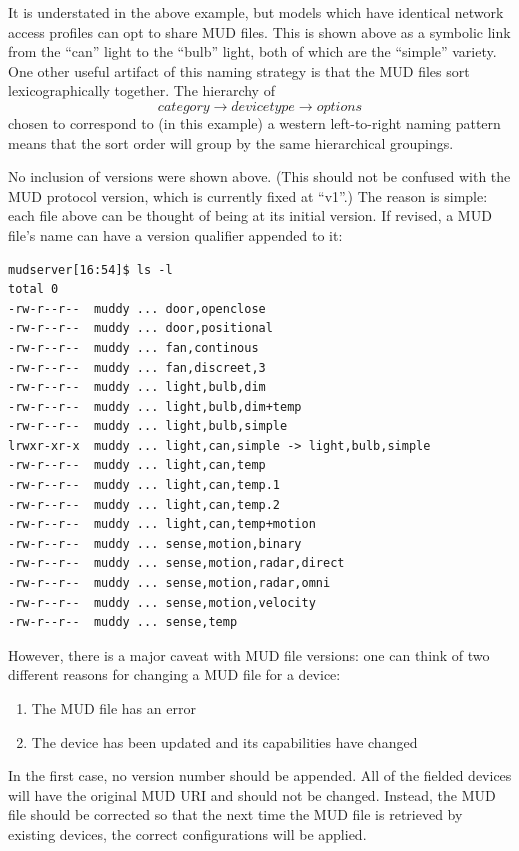 \documentclass[conference]{IEEEtran}
\begin{document}
It is understated in the above example, but models which have
identical network access profiles can opt to share MUD files.  This is
shown above as a symbolic link from the ``can'' light to the ``bulb''
light, both of which are the ``simple'' variety.  One other useful
artifact of this naming strategy is that the MUD files sort
lexicographically together.  The hierarchy of
\begin{equation}
  category \rightarrow device type \rightarrow options
\end{equation}
chosen to correspond to (in this example) a western left-to-right
naming pattern means that the sort order will group by the same
hierarchical groupings.

No inclusion of versions were shown above.  (This should not be
confused with the MUD protocol version, which is currently fixed at
``v1''.)  The reason is simple: each file above can be thought of
being at its initial version.  If revised, a MUD file's name can have
a version qualifier appended to it:

{\ttfamily\scriptsize
\begin{verbatim}
mudserver[16:54]$ ls -l
total 0
-rw-r--r--  muddy ... door,openclose
-rw-r--r--  muddy ... door,positional
-rw-r--r--  muddy ... fan,continous
-rw-r--r--  muddy ... fan,discreet,3
-rw-r--r--  muddy ... light,bulb,dim
-rw-r--r--  muddy ... light,bulb,dim+temp
-rw-r--r--  muddy ... light,bulb,simple
lrwxr-xr-x  muddy ... light,can,simple -> light,bulb,simple
-rw-r--r--  muddy ... light,can,temp
-rw-r--r--  muddy ... light,can,temp.1
-rw-r--r--  muddy ... light,can,temp.2
-rw-r--r--  muddy ... light,can,temp+motion
-rw-r--r--  muddy ... sense,motion,binary
-rw-r--r--  muddy ... sense,motion,radar,direct
-rw-r--r--  muddy ... sense,motion,radar,omni
-rw-r--r--  muddy ... sense,motion,velocity
-rw-r--r--  muddy ... sense,temp
\end{verbatim}
}

However, there is a major caveat with MUD file versions: one can think
of two different reasons for changing a MUD file for a device:
\begin{enumerate}
\item The MUD file has an error
\item The device has been updated and its capabilities have changed
\end{enumerate}

In the first case, no version number should be appended.  All of the
fielded devices will have the original MUD URI and should not be
changed.  Instead, the MUD file should be corrected so that the next
time the MUD file is retrieved by existing devices, the correct
configurations will be applied.
\end{document}
